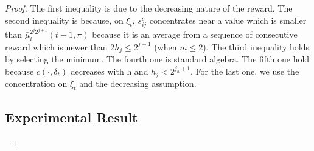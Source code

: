\begin{proof}

The first inequality is due to the decreasing nature of the reward. The second inequality is because, on $\xi_t$, $s_{ij}^c$ concentrates near a value which is smaller than $\bar{\mu}^{2^{j}2^{j+1}}_i(t-1,\pi)$  because it is an average from a sequence of consecutive reward which is newer than $2h_j \leq 2^{j+1}$ (when $m \leq 2$). The third inequality holds by selecting the minimum. The fourth one is standard algebra. The fifth one hold because $c( \cdot, \delta_t)$ decreases with h and $h_j < 2^{j_h+1}$. For the last one, we use the concentration on $\xi_t$ and the decreasing assumption. 

\subsection{Experimental Result}




\end{proof}
